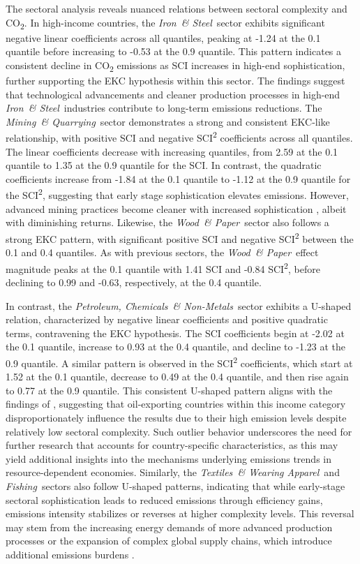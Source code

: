 \documentclass[10pt]{article}
\newcommand{\FI}{\textit{Fishing}}
\newcommand{\IR}{\textit{Iron~\& Steel}}
\newcommand{\MI}{\textit{Mining~\& Quarrying}}
\newcommand{\PE}{\textit{Petroleum, Chemicals~\& Non-Metals}}
\newcommand{\TE}{\textit{Textiles~\& Wearing Apparel}}
\newcommand{\WO}{\textit{Wood~\& Paper}}
\begin{document}
The sectoral analysis reveals nuanced relations between sectoral complexity and CO\textsubscript{2}. In high-income countries, the \IR\ sector exhibits significant negative linear coefficients across all quantiles, peaking at -1.24 at the 0.1 quantile before increasing to -0.53 at the 0.9 quantile. This pattern indicates a consistent decline in CO\textsubscript{2} emissions as SCI increases in high-end sophistication, further supporting the EKC hypothesis within this sector. The findings suggest that technological advancements and cleaner production processes in high-end \IR\ industries contribute to long-term emissions reductions. The \MI\ sector demonstrates a strong and consistent EKC-like relationship, with positive SCI and negative SCI\textsuperscript{2} coefficients across all quantiles. The linear coefficients decrease with increasing quantiles, from 2.59 at the 0.1 quantile to 1.35 at the 0.9 quantile for the SCI. In contrast, the quadratic coefficients increase from -1.84 at the 0.1 quantile to -1.12 at the 0.9 quantile for the SCI\textsuperscript{2}, suggesting that early stage sophistication elevates emissions. However, advanced mining practices become cleaner with increased sophistication \citep{SHAO2016220}, albeit with diminishing returns. Likewise, the \WO\ sector also follows a strong EKC pattern, with significant positive SCI and negative SCI\textsuperscript{2} between the 0.1 and 0.4 quantiles. As with previous sectors, the \WO\ effect magnitude peaks at the 0.1 quantile with 1.41 SCI and -0.84 SCI\textsuperscript{2}, before declining to 0.99 and -0.63, respectively, at the 0.4 quantile.

In contrast, the \PE\ sector exhibits a U-shaped relation, characterized by negative linear coefficients and positive quadratic terms, contravening the EKC hypothesis. The SCI coefficients begin at -2.02 at the 0.1 quantile, increase to 0.93 at the 0.4 quantile, and decline to -1.23 at the 0.9 quantile. A similar pattern is observed in the SCI\textsuperscript{2} coefficients, which start at 1.52 at the 0.1 quantile, decrease to 0.49 at the 0.4 quantile, and then rise again to 0.77 at the 0.9 quantile. This consistent U-shaped pattern aligns with the findings of \cite{moutinhoDeterminantsEnvironmentalKuznets2020}, suggesting that oil-exporting countries within this income category disproportionately influence the results due to their high emission levels despite relatively low sectoral complexity. Such outlier behavior underscores the need for further research that accounts for country-specific characteristics, as this may yield additional insights into the mechanisms underlying emissions trends in resource-dependent economies. Similarly, the \TE\ and \FI\ sectors also follow U-shaped patterns, indicating that while early-stage sectoral sophistication leads to reduced emissions through efficiency gains, emissions intensity stabilizes or reverses at higher complexity levels. This reversal may stem from the increasing energy demands of more advanced production processes or the expansion of complex global supply chains, which introduce additional emissions burdens \citep{10.3389/fenvs.2022.973102}. 
\end{document}
